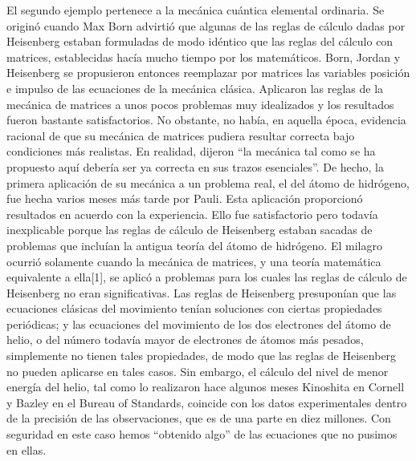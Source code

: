 \documentclass[a4paper, 12pt]{article}
\begin{document}
El segundo ejemplo pertenece a la mecánica cuántica elemental ordinaria. Se originó cuando Max Born advirtió que algunas de las reglas de cálculo dadas por Heisenberg estaban formuladas de modo idéntico que las reglas del cálculo con matrices, establecidas hacía mucho tiempo por los matemáticos. Born, Jordan y Heisenberg se propusieron entonces reemplazar por matrices las variables posición e impulso de las ecuaciones de la mecánica clásica. Aplicaron las reglas de la mecánica de matrices a unos pocos problemas muy idealizados y los resultados fueron bastante satisfactorios. No obstante, no había, en aquella época, evidencia racional de que su mecánica de matrices pudiera resultar correcta bajo condiciones más realistas. En realidad, dijeron ``la mecánica tal como se ha propuesto aquí debería ser ya correcta en sus trazos esenciales''. De hecho, la primera aplicación de su mecánica a un problema real, el del átomo de hidrógeno, fue hecha varios meses más tarde por Pauli. Esta aplicación proporcionó resultados en acuerdo con la experiencia. Ello fue satisfactorio pero todavía inexplicable porque las reglas de cálculo de Heisenberg estaban sacadas de problemas que incluían la antigua teoría del átomo de hidrógeno. El milagro ocurrió solamente cuando la mecánica de matrices, y una teoría matemática equivalente a ella[1], se aplicó a problemas para los cuales las reglas de cálculo de Heisenberg no eran significativas. Las reglas de Heisenberg presuponían que las ecuaciones clásicas del movimiento tenían soluciones con ciertas propiedades periódicas; y las ecuaciones del movimiento de los dos electrones del átomo de helio, o del número todavía mayor de electrones de átomos más pesados, simplemente no tienen tales propiedades, de modo que las reglas de Heisenberg no pueden aplicarse en tales casos. Sin embargo, el cálculo del nivel de menor energía del helio, tal como lo realizaron hace algunos meses Kinoshita en Cornell y Bazley en el Bureau of Standards, coincide con los datos experimentales dentro de la precisión de las observaciones, que es de una parte en diez millones. Con seguridad en este caso hemos ``obtenido algo'' de las ecuaciones que no pusimos en ellas.
\end{document}
